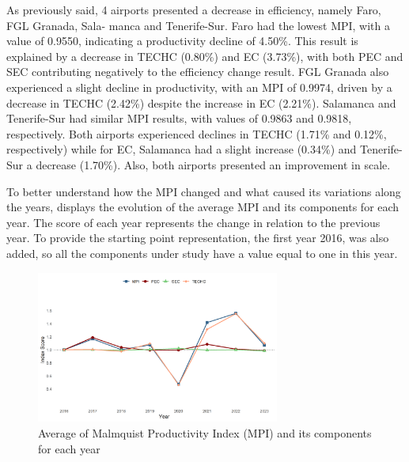 As previously said, 4 airports presented a decrease in efficiency, namely Faro, FGL Granada, Sala-
manca and Tenerife-Sur. Faro had the lowest MPI, with a value of 0.9550, indicating a productivity
decline of 4.50\%. This result is explained by a decrease in TECHC (0.80\%) and EC (3.73\%), with both
PEC and SEC contributing negatively to the efficiency change result. FGL Granada also experienced a
slight decline in productivity, with an MPI of 0.9974, driven by a decrease in TECHC (2.42\%) despite the
increase in EC (2.21\%). Salamanca and Tenerife-Sur had similar MPI results, with values of 0.9863 and
0.9818, respectively. Both airports experienced declines in TECHC (1.71\% and 0.12\%, respectively)
while for EC, Salamanca had a slight increase (0.34\%) and Tenerife-Sur a decrease (1.70\%). Also, both
airports presented an improvement in scale.

To better understand how the MPI changed and what caused its variations along the years, 
displays the evolution of the average MPI and its components for each year. The score of each year
represents the change in relation to the previous year. To provide the starting point representation, the
first year 2016, was also added, so all the components under study have a value equal to one in this
year.
\vspace{-0.5cm}
\begin{figure}[H]
  \centering
  \includegraphics[width=8cm]{images/malmquist_plot.png}
  \vspace{-0.5cm}
  \caption{Average of Malmquist Productivity Index (MPI) and its components for each year}
  \label{fig:malmquist}
\end{figure}
\vspace{-0.5cm}

